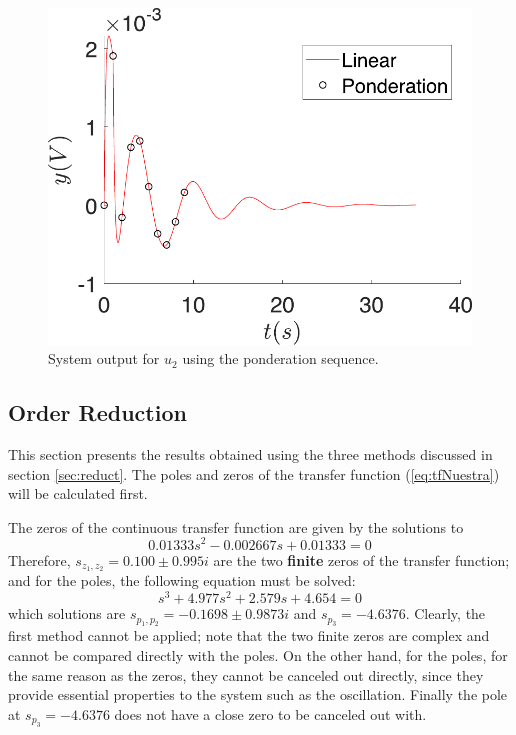 \begin{figure}[ht]
    \centering
    \includegraphics[scale=0.5]{figs/pondrtion/Comp_ponderation_linear_impulse.pdf}
    \caption{System output for $u_2$ using the ponderation sequence.}
    \label{fig:ponderImpulse}
\end{figure}


\subsection{Order Reduction}\label{sec:order_reduction}
This section presents the results obtained using the three methods discussed in section \ref{sec:reduct}. The poles and zeros of the transfer function (\ref{eq:tfNuestra}) will be calculated first.

The zeros of the continuous transfer function are given by the solutions to
\begin{equation}
    0.01333s^2-0.002667s+0.01333=0
\end{equation}
Therefore, $s_{z_1,z_2}=0.100\pm0.995i$ are the two \textbf{finite} zeros of the transfer function; and for the poles, the following equation must be solved:
\begin{equation}
    s^3+4.977s^2+2.579s+4.654=0
\end{equation}
which solutions are $s_{p_1,p_2}=-0.1698\pm0.9873i$ and $s_{p_3}=-4.6376$. Clearly, the first method cannot be applied; note that the two finite zeros are complex and cannot be compared directly with the poles. On the other hand, for the poles, for the same reason as the zeros, they cannot be canceled out directly, since they provide essential properties to the system such as the oscillation. Finally the pole at $s_{p_3}=-4.6376$ does not have a close zero to be canceled out with.

